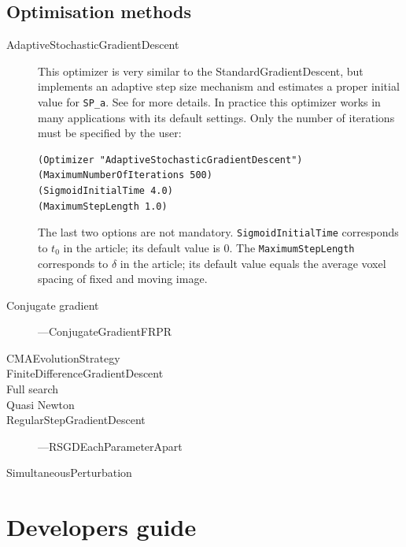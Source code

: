 \documentclass[]{report}
\begin{document}
\section{Optimisation methods}

\begin{description}
\item[AdaptiveStochasticGradientDescent] This optimizer is very similar to
    the StandardGradientDescent, but implements an adaptive step size
    mechanism and estimates a proper initial value for \texttt{SP\_a}. See
    \cite{Klein09} for more details. In practice this optimizer works in
    many applications with its default settings. Only the number of
    iterations must be specified by the user:
\begin{verbatim}
(Optimizer "AdaptiveStochasticGradientDescent")
(MaximumNumberOfIterations 500)
(SigmoidInitialTime 4.0)
(MaximumStepLength 1.0)
\end{verbatim}
The last two options are not mandatory. \texttt{SigmoidInitialTime}
corresponds to $t_0$ in the article; its default value is 0. The
\texttt{MaximumStepLength} corresponds to $\delta$ in the article; its
default value equals the average voxel spacing of fixed and moving image.

\item[Conjugate gradient]
---ConjugateGradientFRPR

\item[CMAEvolutionStrategy]

\item[FiniteDifferenceGradientDescent]

\item[Full search]

\item[Quasi Newton]


\item[RegularStepGradientDescent]
---RSGDEachParameterApart

\item[SimultaneousPerturbation]
\end{description}



\chapter{Developers guide}\label{chp:develop}
\end{document}
